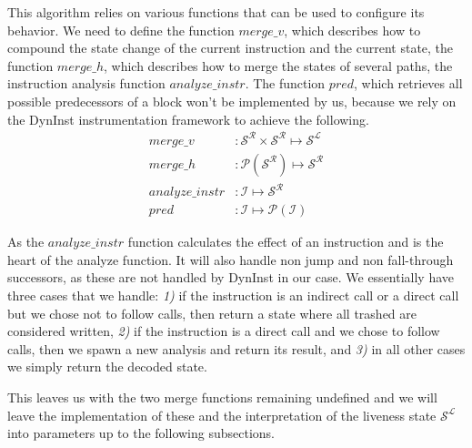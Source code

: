 This algorithm relies on various functions that can be used to configure its behavior. We need to define the 
function $merge\_v$, which describes how to compound the state change of the current instruction and the current state, 
the function $merge\_h$, which describes how to merge the states of several paths, the instruction analysis function
$analyze\_instr$. The function $pred$, which retrieves all possible predecessors of a block won't be implemented by us, 
because we rely on the DynInst instrumentation framework to achieve the following.
\vspace{-.3cm}
\begin{subequations}
\label{eq:livenesscustom}
\begin{align}
merge\_v &: \mathcal{S}^\mathcal{R} \times \mathcal{S}^\mathcal{R} \mapsto \mathcal{S}^\mathcal{L}\\
merge\_h &: \mathcal{P}(\mathcal{S}^\mathcal{R}) \mapsto \mathcal{S}^\mathcal{R}\\
analyze\_instr &: \mathcal {I} \mapsto \mathcal{S}^\mathcal{R} \\
pred &: \mathcal{I} \mapsto \mathcal{P}(\mathcal{I})
\end{align}
\end{subequations}
\vspace{-.8cm}

As the $analyze\_instr$ function calculates the effect of an instruction and is the heart of the analyze function. It will also 
handle non jump and non fall-through successors, as these are not handled by DynInst in our case. We essentially have three cases that we handle:
\textit{1)} if the instruction is an indirect call or a direct call but we chose not to follow calls, then return a state where all trashed 
are considered written,
\textit{2)}  if the instruction is a direct call and we chose to follow calls, then we spawn a new analysis and return its result, and
\textit{3)} in all other cases we simply return the decoded state.

This leaves us with the two merge functions remaining undefined and we will leave the implementation of these and the interpretation of 
the liveness state $\mathcal{S}^\mathcal{L}$ into parameters up to the following subsections.

